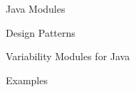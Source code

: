 
\begin{frame}{Java Modules}

\end{frame}



\begin{frame}{Design Patterns}
	\begin{fancycolumns}
		
	\end{fancycolumns}
\end{frame}


\begin{frame}{Variability Modules for Java}
	\begin{fancycolumns}
		
	\end{fancycolumns}
\end{frame}


\begin{frame}{Examples}
	\begin{fancycolumns}
		
	\end{fancycolumns}
\end{frame}


